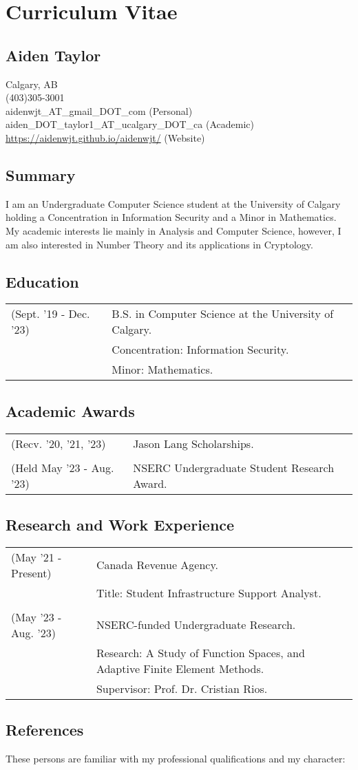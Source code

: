 \documentclass[12pt]{article}
\begin{document}
\section*{Curriculum Vitae}
\subsection*{Aiden Taylor}
Calgary, AB \\
(403)305-3001\\
aidenwjt\_AT\_gmail\_DOT\_com (Personal)\\
aiden\_DOT\_taylor1\_AT\_ucalgary\_DOT\_ca (Academic)\\
\url{https://aidenwjt.github.io/aidenwjt/} (Website)
\subsection*{Summary}
I am an Undergraduate Computer Science student at the University of Calgary holding a Concentration in Information Security and a Minor in Mathematics.
My academic interests lie mainly in Analysis and Computer Science, however, I am also interested in Number Theory and its applications in Cryptology.
\subsection*{Education}
\begin{tabular}{l l}
(Sept. '19 - Dec. '23)&B.S. in Computer Science at the University of Calgary.\\
	& Concentration: Information Security.\\
	& Minor: Mathematics.
\end{tabular}
\subsection*{Academic Awards}
\begin{tabular}{l l}
(Recv. '20, '21, '23)&Jason Lang Scholarships.\\
	&\\
(Held May '23 - Aug. '23)& NSERC Undergraduate Student Research Award.
\end{tabular}
\subsection*{Research and Work Experience}
\begin{tabular}{l l}
(May '21 - Present)&Canada Revenue Agency.\\
	&Title: Student Infrastructure Support Analyst.\\
	&\\
(May '23 - Aug. '23)&NSERC-funded Undergraduate Research.\\
	&Research: A Study of Function Spaces, and Adaptive Finite Element Methods.\\
	&Supervisor: Prof. Dr. Cristian Rios.
\end{tabular}
\subsection*{References}
These persons are familiar with my professional qualifications and my character:
\end{document}
